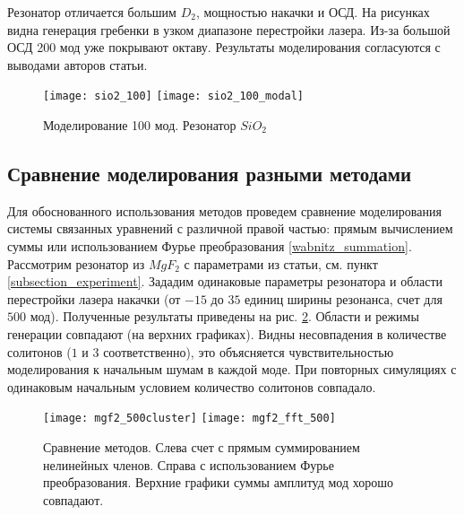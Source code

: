 Резонатор отличается большим $D_2$, мощностью накачки и ОСД. На рисунках видна генерация гребенки в узком диапазоне перестройки лазера. Из-за большой ОСД 200 мод уже покрывают октаву. Результаты моделирования согласуются с выводами авторов статьи.

\begin{figure}
  \texttt{[image: sio2\_100]}
  \texttt{[image: sio2\_100\_modal]}
  \caption{Моделирование 100 мод. Резонатор $SiO_2$} \label{sio2}
\end{figure}

\subsection{Сравнение моделирования разными методами}

Для обоснованного использования методов проведем сравнение моделирования системы связанных уравнений с различной правой частью: прямым вычислением суммы или использованием Фурье преобразования \ref{wabnitz_summation}. Рассмотрим резонатор из $MgF_2$ с параметрами из статьи\cite{Herr2014}, см. пункт \ref{subsection_experiment}. Зададим одинаковые параметры резонатора и области перестройки лазера накачки (от $-15$ до $35$ единиц ширины резонанса, счет для $500$ мод). Полученные результаты приведены на рис. \ref{comparison_sum_ft}. Области и режимы генерации совпадают (на верхних графиках). Видны несовпадения в количестве солитонов ($1$ и $3$ соответственно), это объясняется чувствительностью моделирования к начальным шумам в каждой моде. При повторных симуляциях с одинаковым начальным условием количество солитонов совпадало.
\begin{figure}
  \texttt{[image: mgf2\_500cluster]}
  \texttt{[image: mgf2\_fft\_500]}
  \caption{Сравнение методов. Слева счет с прямым суммированием нелинейных членов. Справа с использованием Фурье преобразования. Верхние графики суммы амплитуд мод хорошо совпадают.} \label{comparison_sum_ft}
\end{figure}

